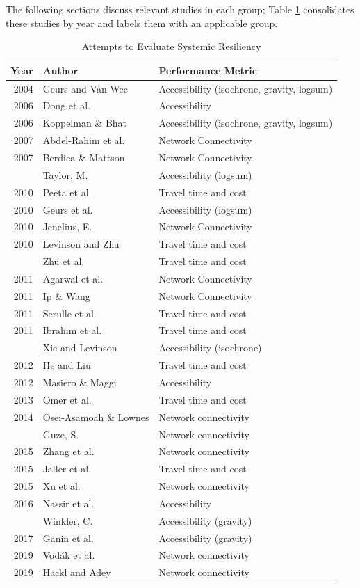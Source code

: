 The following sections discuss relevant studies in each group; Table
\ref{tab:authortable} consolidates these studies by year and labels them
with
an applicable group.

\begin{table}

\caption{\label{tab:authortable}Attempts to Evaluate Systemic Resiliency}
\centering
\begin{tabular}[t]{rll}
\toprule
Year & Author & Performance Metric\\
\midrule
2004 & Geurs and Van Wee & Accessibility (isochrone, gravity, logsum)\\
2006 & Dong et al. & Accessibility\\
2006 & Koppelman \& Bhat & Accessibility (isochrone, gravity, logsum)\\
2007 & Abdel-Rahim et al. & Network Connectivity\\
2007 & Berdica \& Mattson & Network Connectivity\\
\addlinespace
2008 & Taylor, M. & Accessibility (logsum)\\
2010 & Peeta et al. & Travel time and cost\\
2010 & Geurs et al. & Accessibility (logsum)\\
2010 & Jenelius, E. & Network Connectivity\\
2010 & Levinson and Zhu & Travel time and cost\\
\addlinespace
2010 & Zhu et al. & Travel time and cost\\
2011 & Agarwal et al. & Network Connectivity\\
2011 & Ip \& Wang & Network Connectivity\\
2011 & Serulle et al. & Travel time and cost\\
2011 & Ibrahim et al. & Travel time and cost\\
\addlinespace
2011 & Xie and Levinson & Accessibility (isochrone)\\
2012 & He and Liu & Travel time and cost\\
2012 & Masiero \& Maggi & Accessibility \\
2013 & Omer et al. & Travel time and cost\\
2014 & Osei-Asamoah \& Lownes & Network connectivity\\
\addlinespace
2014 & Guze, S. & Network connectivity\\
2015 & Zhang et al. & Network connectivity\\
2015 & Jaller et al. & Travel time and cost\\
2015 & Xu et al. & Network connectivity\\
2016 & Nassir et al. & Accessibility \\
\addlinespace
2016 & Winkler, C. & Accessibility (gravity)\\
2017 & Ganin et al. & Accessibility (gravity)\\
2019 & Vodák et al. & Network connectivity\\
2019 & Hackl and Adey & Network connectivity\\
\bottomrule
\end{tabular}
\end{table}

